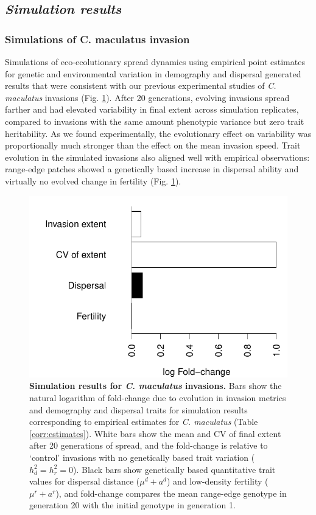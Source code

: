 \documentclass[11pt]{article}
\begin{document}
\subsection*{\textit{Simulation results}}
\subsubsection*{Simulations of \textup{C. maculatus} invasion}
Simulations of eco-ecolutionary spread dynamics using empirical point estimates for genetic and environmental variation in demography and dispersal generated results that were consistent with our previous experimental studies of \textit{C. maculatus} invasions (Fig. \ref{corr:barplot}).
After 20 generations, evolving invasions spread farther and had elevated variability in final extent across simulation replicates, compared to invasions with the same amount phenotypic variance but zero trait heritability.
As we found experimentally, the evolutionary effect on variability was proportionally much stronger than the effect on the mean invasion speed.
Trait evolution in the simulated invasions also aligned well with empirical observations: range-edge patches showed a genetically based increase in dispersal ability and virtually no evolved change in fertility (Fig. \ref{corr:barplot}).

\begin{figure}[h!]
\centering
\includegraphics[width=0.5\linewidth]{Figures/foldchange_barplot}
\caption{\textbf{Simulation results for \textit{C. maculatus} invasions.} Bars show the natural logarithm of fold-change due to evolution in invasion metrics and demography and dispersal traits for simulation results corresponding to empirical estimates for \textit{C. maculatus} (Table \ref{corr:estimates}).
White bars show the mean and CV of final extent after 20 generations of spread, and the fold-change is relative to `control' invasions with no genetically based trait variation ($h^{2}_{d} = h^{2}_{r} = 0$).
Black bars show genetically based quantitative trait values for dispersal distance ($\mu^{d} + a^{d}$) and low-density fertility ($\mu^{r} + a^{r}$), and fold-change compares the mean range-edge genotype in generation 20 with the initial genotype in generation 1.}
\label{corr:barplot}
\end{figure}
\end{document}
